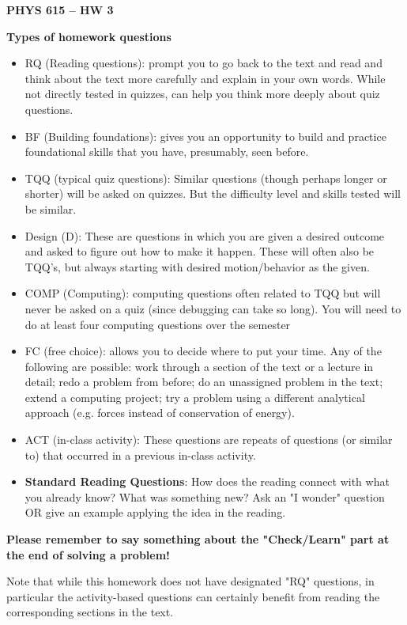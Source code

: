 \documentclass[12pt]{article}
\newcommand{\shortlist}{%
\parindent 0in%
\parskip   0in%
\itemsep   0in%
\topsep    0in%
\parsep    0in%
}
\newcommand{\Title}{PHYS 615 -- HW 3}
\begin{document}
\begin{center}
  {\Large\bfseries\Title}

\end{center}
\bigskip
\bigskip

\textbf{Types of homework questions}
\begin{itemize}\shortlist
  \item	RQ (Reading questions):  prompt you to go back to the text and read and think about the text more carefully and explain in your own words. While not directly tested in quizzes, can help you think more deeply about quiz questions.
  \item	BF (Building foundations):  gives you an opportunity to build and practice foundational skills that you have, presumably, seen before.
  \item	TQQ (typical quiz questions):   Similar questions (though perhaps longer or shorter) will be asked on quizzes.  But the difficulty level and skills tested will be similar.
  \item Design (D):  These are questions in which you are given a desired outcome and asked to figure out how to make it happen.  These will often also be TQQ’s, but always starting with desired motion/behavior as the given.
  \item	COMP (Computing): computing questions often related to TQQ but will never be asked on a quiz (since debugging can take so long).  You will need to do at least four computing questions over the semester
  \item	FC (free choice): allows you to decide where to put your time.  Any of the following are possible:  work through a section of the text or a lecture in detail; redo a problem from before; do an unassigned problem in the text; extend a computing project; try a problem using a different analytical approach (e.g. forces instead of conservation of energy).
  \item ACT (in-class activity): These questions are repeats of questions (or similar to) that occurred in a previous in-class activity.
  \item \textbf{Standard Reading Questions}: How does the reading connect with what you already know? What was something new?  Ask an "I wonder" question OR give an example applying the idea in the reading.
\end{itemize}

\textbf{Please remember to say something about the "Check/Learn" part at the end of solving a problem!}

Note that while this homework does not have designated "RQ" questions, in particular the activity-based questions can certainly benefit from reading the corresponding sections in the text.
\end{document}
